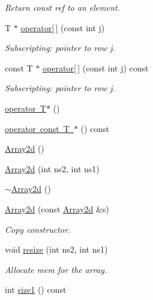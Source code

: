 \begin{DoxyCompactItemize}
\begin{DoxyCompactList}\small\item\em Return const ref to an element. \end{DoxyCompactList}\item 
T $\ast$ \mbox{\hyperlink{classXMLArray_1_1Array2d_a1e5b7fa596ec682113700320b08e66d5}{operator\mbox{[}$\,$\mbox{]}}} (const int j)
\begin{DoxyCompactList}\small\item\em Subscripting\+: pointer to row j. \end{DoxyCompactList}\item 
const T $\ast$ \mbox{\hyperlink{classXMLArray_1_1Array2d_a956a4739a0e6529302542b0fdf3c1da8}{operator\mbox{[}$\,$\mbox{]}}} (const int j) const
\begin{DoxyCompactList}\small\item\em Subscripting\+: pointer to row j. \end{DoxyCompactList}\item 
\mbox{\hyperlink{classXMLArray_1_1Array2d_a9d46505eb6c4149239bc87ba408c6b5b}{operator T$\ast$}} ()
\item 
\mbox{\hyperlink{classXMLArray_1_1Array2d_aabd815b03d3dfbcc079cab62408c6dfd}{operator const T $\ast$}} () const
\item 
\mbox{\hyperlink{classXMLArray_1_1Array2d_a2f24eccb279e2f1685b58b41f61d9330}{Array2d}} ()
\item 
\mbox{\hyperlink{classXMLArray_1_1Array2d_acb1e955b2aa805f3192c50cd723df524}{Array2d}} (int ns2, int ns1)
\item 
\mbox{\hyperlink{classXMLArray_1_1Array2d_a57639b142c7754fa2c11bb3ac5ee76d7}{$\sim$\+Array2d}} ()
\item 
\mbox{\hyperlink{classXMLArray_1_1Array2d_a0646ba9d0ce7616c1cc4a84a4794b186}{Array2d}} (const \mbox{\hyperlink{classXMLArray_1_1Array2d}{Array2d}} \&s)
\begin{DoxyCompactList}\small\item\em Copy constructor. \end{DoxyCompactList}\item 
void \mbox{\hyperlink{classXMLArray_1_1Array2d_a64001cb2aac062d2179a0285b0279244}{resize}} (int ns2, int ns1)
\begin{DoxyCompactList}\small\item\em Allocate mem for the array. \end{DoxyCompactList}\item 
int \mbox{\hyperlink{classXMLArray_1_1Array2d_a0f5dd764b391ddffd3d89c71bbc6c614}{size1}} () const

\end{DoxyCompactItemize}
